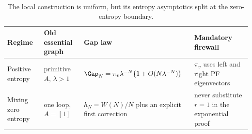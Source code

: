 \begin{table}[t]
\caption{The local construction is uniform, but its entropy asymptotics split
at the zero-entropy boundary.}
\label{tab:regimes}
\centering
\small
\renewcommand{\arraystretch}{1.12}
\begin{tabularx}{\textwidth}{@{}>{\raggedright\arraybackslash}p{}
>{\raggedright\arraybackslash}p{}
>{\raggedright\arraybackslash}p{}X@{}}
\toprule
Regime & Old essential graph & Gap law & Mandatory firewall \\
\midrule
Positive entropy
& primitive $A$, $\lambda>1$
& $\Gap_N=\pi_v\lambda^{-N}\{1+O(N\lambda^{-N})\}$
& $\pi_v$ uses left and right PF eigenvectors \\
Mixing zero entropy
& one loop, $A=[1]$
& $h_N=W(N)/N$ plus an explicit first correction
& never substitute $r=1$ in the exponential proof \\
\bottomrule
\end{tabularx}
\end{table}

